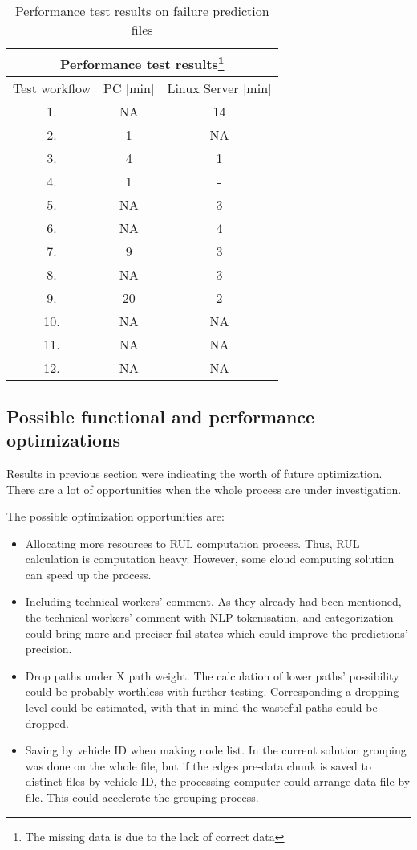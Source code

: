 \begin{table}[H]
\centering
\begin{tabular}{ |c|c|c|  }
\hline
\multicolumn{3}{|c|}{Performance test results\footnote{The missing data is due to the lack of correct data}} \\
\hline
Test workflow& PC [min] & Linux Server [min]\\
\hline
1.& NA & 14 \\
2.& 1 & NA \\
3.& 4 & 1 \\
4.& 1 & - \\
5.& NA & 3 \\
6.& NA & 4 \\
7.& 9 & 3 \\
8.& NA & 3 \\
9.& 20 & 2 \\
10.& NA & NA \\
11.& NA & NA \\
12.& NA & NA \\
\hline
\end{tabular}
\caption{Performance test results on failure prediction files}
\label{table:3}
\end{table}
\subsection{Possible functional and performance optimizations}
Results in previous section were indicating the worth of future optimization. There are a lot of opportunities when the whole process are under investigation.

The possible optimization opportunities are:
\begin{itemize}
	\item{Allocating more resources to RUL computation process.} Thus, RUL calculation is computation heavy. However, some cloud computing solution can speed up the process.
	\item{Including technical workers' comment.} As they already had been mentioned, the technical workers' comment with NLP tokenisation, and categorization could bring more and preciser fail states which could improve the predictions' precision.
	\item{Drop paths under X path weight.} The calculation of lower paths' possibility could be probably worthless with further testing. Corresponding a dropping level could be estimated, with that in mind the wasteful paths could be dropped.
	\item{Saving by vehicle ID when making node list.} In the current solution grouping was done on the whole file, but if the edges pre-data chunk is saved to distinct files by vehicle ID, the processing computer could arrange data file by file. This could accelerate the grouping process.
\end{itemize} 
